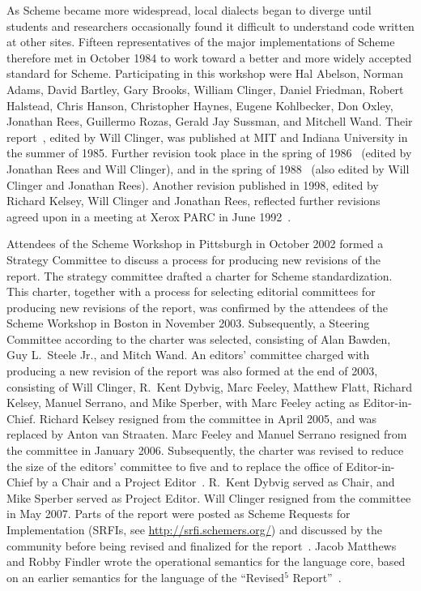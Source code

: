 \documentclass[twoside,twocolumn]{algol60}
\begin{document}
\vest As Scheme became more widespread,
local dialects began to diverge until students and researchers
occasionally found it difficult to understand code written at other
sites.
Fifteen representatives of the major implementations of Scheme therefore
met in October 1984 to work toward a better and more widely accepted
standard for Scheme.
Participating in this workshop were Hal Abelson, Norman Adams, David
Bartley, Gary Brooks, William Clinger, Daniel Friedman, Robert Halstead,
Chris Hanson, Christopher Haynes, Eugene Kohlbecker, Don Oxley, Jonathan Rees,
Guillermo Rozas, Gerald Jay Sussman, and Mitchell Wand.
Their report~\cite{RRRS}, edited by Will Clinger,
was published at MIT and Indiana University in the summer of 1985.
Further revision took place in the spring of 1986~\cite{R3RS} (edited
by Jonathan Rees and Will Clinger),
and in the spring of 1988~\cite{R4RS} (also edited by Will Clinger and
Jonathan Rees).  Another revision published in 1998, edited
by Richard Kelsey, Will Clinger and Jonathan Rees,
reflected further revisions agreed upon in a meeting at Xerox PARC in
June 1992~\cite{R5RS}.

Attendees of the Scheme Workshop in Pittsburgh in October 2002 formed
a Strategy Committee to discuss a process for producing new revisions
of the report.  The strategy committee drafted a charter for Scheme
standardization.  This charter, together with a process for selecting
editorial committees for producing new revisions of the report, was
confirmed by the attendees of the Scheme Workshop in Boston in
November 2003.  Subsequently, a Steering Committee according to the
charter was selected, consisting of Alan Bawden, Guy L.\ Steele Jr.,
and Mitch Wand.  An editors' committee charged with producing a new
revision of the report was
also formed at the end of 2003, consisting of Will Clinger,
R.\ Kent Dybvig, Marc Feeley, Matthew Flatt, Richard Kelsey, Manuel
Serrano, and Mike Sperber, with Marc Feeley acting as Editor-in-Chief.
Richard Kelsey resigned from the committee in April 2005, and was
replaced by Anton van Straaten.  
Marc Feeley and Manuel Serrano
resigned from the committee in January 2006.  Subsequently, the charter
was revised to reduce the size of the editors' committee to five and
to replace the office of Editor-in-Chief by a Chair and a Project
Editor~\cite{SchemeCharter2006}.  R.\ Kent Dybvig served as Chair, and
Mike Sperber served as Project Editor.  Will Clinger resigned from the
committee in May 2007.
Parts of the report were posted as Scheme Requests for Implementation
(SRFIs, see \url{http://srfi.schemers.org/})
and discussed by the community before being revised and finalized for
the report~\cite{srfi75,srfi76,srfi77,srfi83,srfi93}.
Jacob Matthews and Robby
Findler wrote the operational semantics for the language core,
 based on an earlier semantics for the language of the
``Revised$^5$ Report''~\cite{mf:scheme-op-sem}.
\end{document}
